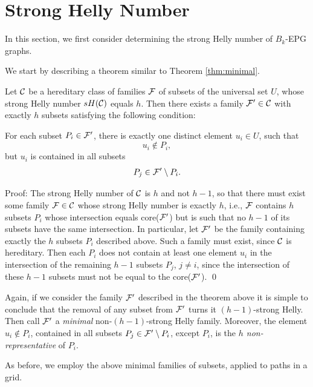 \section{Strong Helly Number} \label{sec:strongHellyNumber}

In this section, we first consider determining the strong Helly number of $B_k$-EPG graphs.

We start by describing a theorem similar to Theorem \ref{thm:minimal}.

\begin{theorem}\label{thm:minimal-strong}

Let ${\cal C}$ be a hereditary class of families $\cal F$ of subsets of the universal set $U$, whose strong Helly number $sH({\cal C})$ equals $h$. Then there exists a family ${\cal F'} \in {\cal C}$ with exactly $h$ subsets satisfying the following condition: 

For each subset $P_i \in \cal {F'}$, there is exactly one distinct element $u_i \in U$, such that \\
$$u_i \not \in P_i,$$ 
but $u_i$ is contained in all  subsets 
$$P_j \in {\cal F'} \setminus P_i.$$
\end{theorem}

Proof: The strong Helly number of ${\cal C}$ is $h$ and not $h - 1$, so that  there must exist some family ${\cal F} \in {\cal C}$ whose strong Helly number is exactly $h$, i.e., $\cal F$  contains $h$ subsets $P_i$ whose intersection equals  core($\cal F'$) but is such that no  $h-1$ of its subsets have the same intersection. In particular, let $\cal F'$ be the family containing exactly the $h$ subsets $P_i$ described above. Such a family must exist, since $\cal C$ is hereditary. Then each $P_i$ does not contain at least one element $u_i$ in the intersection of the remaining $h-1$ subsets $P_j$, $j \ne i$, 
since the intersection of these $h-1$ subsets must not be equal to the core($\cal F'$).  \qed

Again, if we consider the family $\cal F'$ described in the theorem above it is simple to conclude that the removal of any subset from $\cal {F'}$ turns it $(h-1)$-strong Helly.  Then call $\cal {F'}$ a {\it minimal} non-$(h-1)$-strong Helly family. Moreover, the element $u_i \not \in P_i$, contained in all subsets $P_j \in {\cal{F'}} \setminus P_i$, except $P_i$, is the {\it $h$ non-representative} of $P_i$.  

As before, we employ the above minimal families of subsets, applied to paths in a grid.

